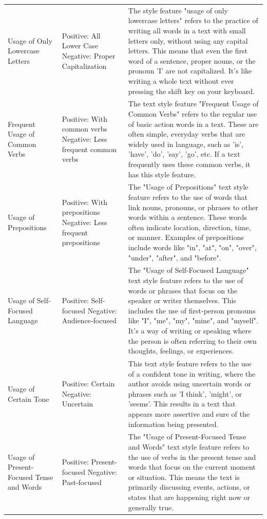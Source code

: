 {{\begin{longtable}{p{4cm} p{4cm} p{6.5cm}}
Usage of Only Lowercase Letters & Positive: All Lower Case \newline Negative: Proper Capitalization & The style feature "usage of only lowercase letters" refers to the practice of writing all words in a text with small letters only, without using any capital letters. This means that even the first word of a sentence, proper nouns, or the pronoun 'I' are not capitalized. It's like writing a whole text without ever pressing the shift key on your keyboard. \\
Frequent Usage of Common Verbs & Positive: With common verbs \newline Negative: Less frequent common verbs & The text style feature "Frequent Usage of Common Verbs" refers to the regular use of basic action words in a text. These are often simple, everyday verbs that are widely used in language, such as 'is', 'have', 'do', 'say', 'go', etc. If a text frequently uses these common verbs, it has this style feature. \\
Usage of Prepositions & Positive: With prepositions \newline Negative: Less frequent prepositions & The "Usage of Prepositions" text style feature refers to the use of words that link nouns, pronouns, or phrases to other words within a sentence. These words often indicate location, direction, time, or manner. Examples of prepositions include words like "in", "at", "on", "over", "under", "after", and "before". \\
Usage of Self-Focused Language & Positive: Self-focused \newline Negative: Audience-focused & The "Usage of Self-Focused Language" text style feature refers to the use of words or phrases that focus on the speaker or writer themselves. This includes the use of first-person pronouns like "I", "me", "my", "mine", and "myself". It's a way of writing or speaking where the person is often referring to their own thoughts, feelings, or experiences. \\
Usage of Certain Tone & Positive: Certain \newline Negative: Uncertain & This text style feature refers to the use of a confident tone in writing, where the author avoids using uncertain words or phrases such as 'I think', 'might', or 'seems'. This results in a text that appears more assertive and sure of the information being presented. \\
Usage of Present-Focused Tense and Words & Positive: Present-focused \newline Negative: Past-focused & The "Usage of Present-Focused Tense and Words" text style feature refers to the use of verbs in the present tense and words that focus on the current moment or situation. This means the text is primarily discussing events, actions, or states that are happening right now or generally true. \\

\end{longtable}}}
